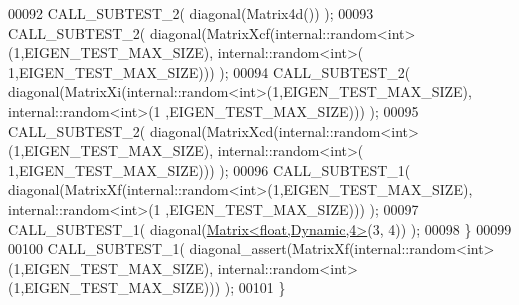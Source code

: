 \begin{DoxyCode}
00092     CALL\_SUBTEST\_2( diagonal(Matrix4d()) );
00093     CALL\_SUBTEST\_2( diagonal(MatrixXcf(internal::random<int>(1,EIGEN\_TEST\_MAX\_SIZE), internal::random<int>(
      1,EIGEN\_TEST\_MAX\_SIZE))) );
00094     CALL\_SUBTEST\_2( diagonal(MatrixXi(internal::random<int>(1,EIGEN\_TEST\_MAX\_SIZE), internal::random<int>(1
      ,EIGEN\_TEST\_MAX\_SIZE))) );
00095     CALL\_SUBTEST\_2( diagonal(MatrixXcd(internal::random<int>(1,EIGEN\_TEST\_MAX\_SIZE), internal::random<int>(
      1,EIGEN\_TEST\_MAX\_SIZE))) );
00096     CALL\_SUBTEST\_1( diagonal(MatrixXf(internal::random<int>(1,EIGEN\_TEST\_MAX\_SIZE), internal::random<int>(1
      ,EIGEN\_TEST\_MAX\_SIZE))) );
00097     CALL\_SUBTEST\_1( diagonal(\hyperlink{group___core___module_class_eigen_1_1_matrix}{Matrix<float,Dynamic,4>}(3, 4)) );
00098   \}
00099 
00100   CALL\_SUBTEST\_1( diagonal\_assert(MatrixXf(internal::random<int>(1,EIGEN\_TEST\_MAX\_SIZE), 
      internal::random<int>(1,EIGEN\_TEST\_MAX\_SIZE))) );
00101 \}
\end{DoxyCode}
